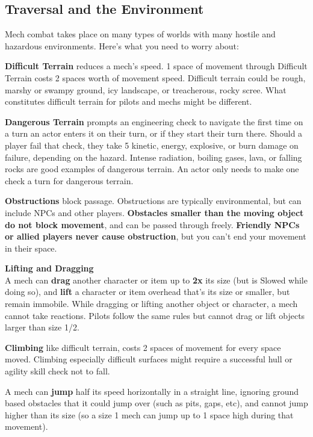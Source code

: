 \subsection{Traversal and the Environment}

Mech combat takes place on many types of worlds with many hostile and hazardous environments. Here's what you need to worry about:


\textbf{Difficult Terrain} reduces a mech's speed. 1 space of movement through Difficult Terrain costs 2 spaces worth of movement speed. Difficult terrain could be rough, marshy or swampy ground, icy landscape, or treacherous, rocky scree. What constitutes difficult terrain for pilots and mechs might be different.

\textbf{Dangerous Terrain} prompts an engineering check to navigate the first time on a turn an actor enters it on their turn, or if they start their turn there. Should a player fail that check, they take 5 kinetic, energy, explosive, or burn damage on failure, depending on the hazard. Intense radiation, boiling gases, lava, or falling rocks are good examples of dangerous terrain. An actor only needs to make one check a turn for dangerous terrain.

\textbf{Obstructions} block passage. Obstructions are typically environmental, but can include NPCs and other players. \textbf{Obstacles smaller than the moving object do not block movement}, and can be passed through freely. \textbf{Friendly NPCs or allied players never cause obstruction}, but you can't end your movement in their space.


\textbf{Lifting and Dragging}\\
A mech can \textbf{drag} another character or item up to \textbf{2x} its size (but is Slowed while doing so), and \textbf{lift} a character or item overhead that's its size or smaller, but remain immobile. While dragging or lifting another object or character, a mech cannot take reactions. Pilots follow the same rules but cannot drag or lift objects larger than size 1/2.

\textbf{Climbing} like difficult terrain, costs 2 spaces of movement for every space moved. Climbing especially difficult surfaces might require a successful hull or agility skill check not to fall.


A mech can \textbf{jump} half its speed horizontally in a straight line, ignoring ground based obstacles that it could jump over (such as pits, gaps, etc), and cannot jump higher than its size (so a size 1 mech can jump up to 1 space high during that movement).

